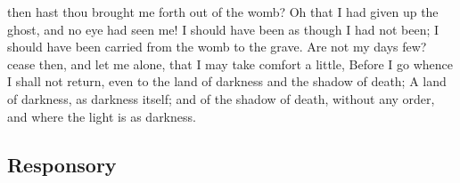  then hast thou brought me forth out of the womb? Oh that I had given up the ghost, and no eye had seen me! I should have been as though I had not been; I should have been carried from the womb to the grave. Are not my days few? cease then, and let me alone, that I may take comfort a little, Before I go whence I shall not return, even to the land of darkness and the shadow of death; A land of darkness, as darkness itself; and of the shadow of death, without any order, and where the light is as darkness.

\vspace{-0.3\baselineskip}

\subsection{Responsory}

